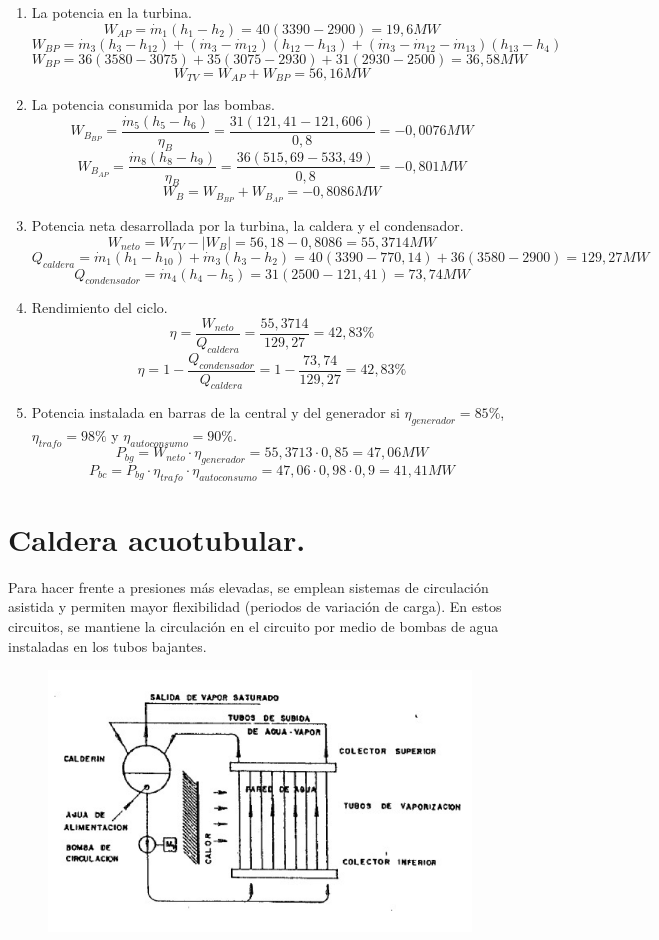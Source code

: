\begin{enumerate}
\begin{enumerate}
\begin{itemize}
		\end{itemize}
		\item La potencia en la turbina.
		\[W_{AP}=\dot{m}_1(h_1-h_2)=40(3390-2900)=19,6MW\]
		\[W_{BP}=\dot{m}_3(h_3-h_{12})+(\dot{m}_3-\dot{m}_{12})(h_{12}-h_{13})+
		(\dot{m}_3-\dot{m}_{12}-\dot{m}_{13})(h_{13}-h_4)\]
		\[W_{BP}=
		36(3580-3075)+
		35(3075-2930)+
		31(2930-2500)=36,58MW\]
		\[W_{TV}=W_{AP}+W_{BP}=56,16MW\]
		\item La potencia consumida por las bombas.
		\[W_{B_{BP}}=\frac{\dot{m}_5(h_5-h_6)}{\eta_B}=\frac{31(121,41-121,606)}{0,8}=-0,0076MW\]
		\[W_{B_{AP}}=\frac{\dot{m}_8(h_8-h_9)}{\eta_B}=\frac{36(515,69-533,49)}{0,8}=-0,801MW\]
		\[W_B=W_{B_{BP}}+W_{B_{AP}}=-0,8086MW\]
		\item Potencia neta desarrollada por la turbina, la caldera y el condensador.
		\[W_{neto}=W_{TV}-|W_B|=56,18-0,8086=55,3714MW\]
		\[Q_{caldera}=\dot{m}_1(h_1-h_{10})+\dot{m}_3(h_3-h_2)=40(3390-770,14)+36(3580-2900)=129,27MW\]
		\[Q_{condensador}=\dot{m}_4(h_4-h_5)=31(2500-121,41)=73,74MW\]
		\item Rendimiento del ciclo.
		\[\eta=\frac{W_{neto}}{Q_{caldera}}=\frac{55,3714}{129,27}=42,83\%\]
		\[\eta=1-\frac{Q_{condensador}}{Q_{caldera}}=1-\frac{73,74}{129,27}=42,83\%\]
		\item Potencia instalada en barras de la central y del generador si $\eta_{generador}=85\%$, $\eta_{trafo}=98\%$ y $\eta_{autoconsumo}=90\%$.
		\[P_{bg}=W_{neto}\cdot\eta_{generador}=55,3713\cdot0,85=47,06MW\]
		\[P_{bc}=P_{bg}\cdot\eta_{trafo} \cdot \eta_{autoconsumo}=47,06\cdot 0,98 \cdot0,9=41,41MW\]
	\end{enumerate}
\end{enumerate}


\newpage
\section{Caldera acuotubular.}
Para hacer frente a presiones más elevadas, se emplean sistemas de circulación asistida y permiten mayor flexibilidad (periodos de variación de carga). En estos circuitos, se mantiene la circulación en el circuito por medio de bombas de agua instaladas en los tubos bajantes.
\begin{figure}[H]
	\centering
	\includegraphics[width=0.7\linewidth]{res/tema10/autotubu}
	\label{fig:autotubu}
\end{figure}



